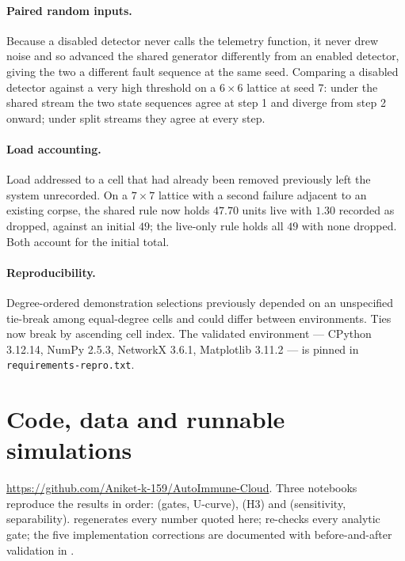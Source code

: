 \documentclass[11pt,a4paper]{article}
\begin{document}
\paragraph{Paired random inputs.}
Because a disabled detector never calls the telemetry function, it never drew
noise and so advanced the shared generator differently from an enabled
detector, giving the two a different fault sequence at the same seed. Comparing
a disabled detector against a very high threshold on a $6\times6$ lattice at
seed 7: under the shared stream the two state sequences agree at step 1 and
diverge from step 2 onward; under split streams they agree at every step.

\paragraph{Load accounting.}
Load addressed to a cell that had already been removed previously left the
system unrecorded. On a $7\times7$ lattice with a second failure adjacent to an
existing corpse, the shared rule now holds $47.70$ units live with $1.30$
recorded as dropped, against an initial $49$; the live-only rule holds all $49$
with none dropped. Both account for the initial total.

\paragraph{Reproducibility.}
Degree-ordered demonstration selections previously depended on an unspecified
tie-break among equal-degree cells and could differ between environments. Ties
now break by ascending cell index. The validated environment --- CPython
3.12.14, NumPy 2.5.3, NetworkX 3.6.1, Matplotlib 3.11.2 --- is pinned in
\texttt{requirements-repro.txt}.

\section*{Code, data and runnable simulations}
\begin{sloppypar}
\noindent\url{https://github.com/Aniket-k-159/AutoImmune-Cloud}. Three
notebooks reproduce the results in order: 
(gates, U-curve),  (H3) and
 (sensitivity, separability).
 regenerates every number quoted here;
 re-checks every analytic gate; the five
implementation corrections are documented with before-and-after validation in
.
\end{sloppypar}
\end{document}
